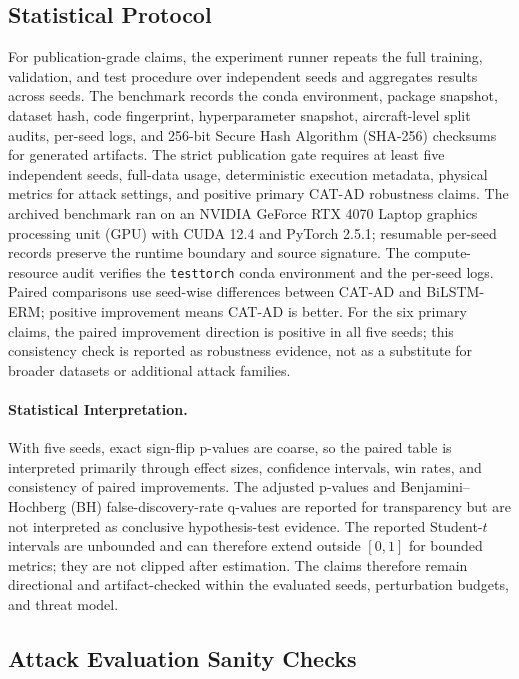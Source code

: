 \documentclass[runningheads]{llncs}
\begin{document}
\subsection{Statistical Protocol}
\label{subsec:statistical_protocol}

For publication-grade claims, the experiment runner repeats the full training, validation, and test procedure over independent seeds and aggregates results across seeds.
The benchmark records the conda environment, package snapshot, dataset hash, code fingerprint, hyperparameter snapshot, aircraft-level split audits, per-seed logs, and 256-bit Secure Hash Algorithm (SHA-256) checksums for generated artifacts.
The strict publication gate requires at least five independent seeds, full-data usage, deterministic execution metadata, physical metrics for attack settings, and positive primary CAT-AD robustness claims.
The archived benchmark ran on an NVIDIA GeForce RTX 4070 Laptop graphics processing unit (GPU) with CUDA 12.4 and PyTorch 2.5.1; resumable per-seed records preserve the runtime boundary and source signature.
The compute-resource audit verifies the \texttt{testtorch} conda environment and the per-seed logs.
Paired comparisons use seed-wise differences between CAT-AD and BiLSTM-ERM; positive improvement means CAT-AD is better.
For the six primary claims, the paired improvement direction is positive in all five seeds; this consistency check is reported as robustness evidence, not as a substitute for broader datasets or additional attack families.

\paragraph{Statistical Interpretation.}
With five seeds, exact sign-flip p-values are coarse, so the paired table is interpreted primarily through effect sizes, confidence intervals, win rates, and consistency of paired improvements.
The adjusted p-values and Benjamini--Hochberg (BH) false-discovery-rate q-values are reported for transparency but are not interpreted as conclusive hypothesis-test evidence.
The reported Student-$t$ intervals are unbounded and can therefore extend outside $[0,1]$ for bounded metrics; they are not clipped after estimation.
The claims therefore remain directional and artifact-checked within the evaluated seeds, perturbation budgets, and threat model.

\subsection{Attack Evaluation Sanity Checks}
\label{subsec:attack_sanity}
\end{document}
